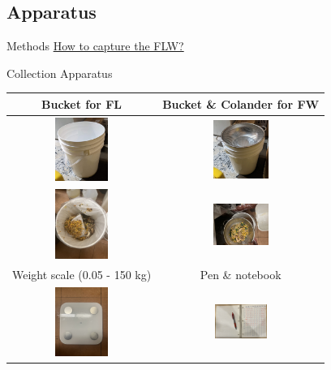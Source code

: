 \documentclass{beamer}
\begin{document}
\subsection{Apparatus}
\begin{frame}{Methods}
    \underline{How to capture the FLW?}
    \begin{block}{Collection Apparatus}
            \begin{tabular}{cc}
                    Bucket for FL & Bucket \& Colander for FW \\ \hline
                    \includegraphics[width=1.7cm]{busket.jpg}
                    & 
                    \includegraphics[width=1.8cm]{busketStrainer.jpg}\\
                    \includegraphics[width=1.7cm]{fl.jpg}
                    & 
                    \includegraphics[width=1.8cm]{leftovers.jpg}\\
                    \hline
                    Weight scale (0.05 - 150 kg) & Pen \& notebook\\ %
                    \includegraphics[width=1.7cm]{scale.jpg}
                    & 
                    \includegraphics[width=1.7cm]{notebookPen.jpg}
            \end{tabular}
    \end{block}
\end{frame}
\end{document}
